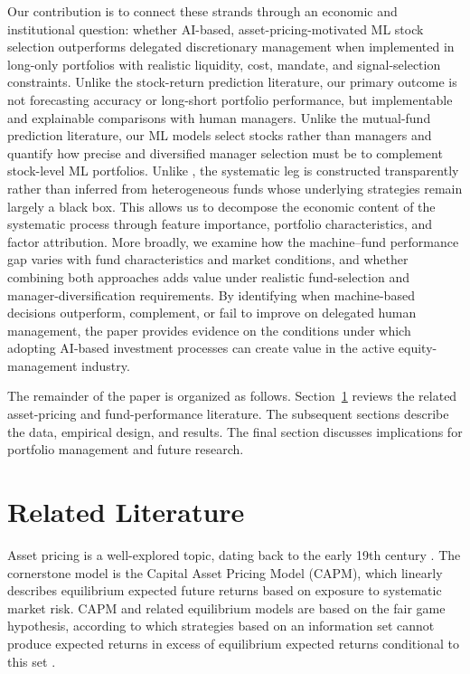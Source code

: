 \documentclass[preprint,12pt,authoryear]{elsarticle}
\begin{document}
Our contribution is to connect these strands through an economic and institutional question: whether AI-based, asset-pricing-motivated ML stock selection outperforms delegated discretionary management when implemented in long-only portfolios with realistic liquidity, cost, mandate, and signal-selection constraints. Unlike the stock-return prediction literature, our primary outcome is not forecasting accuracy or long-short portfolio performance, but implementable and explainable comparisons with human managers. Unlike the mutual-fund prediction literature, our ML models select stocks rather than managers and quantify how precise and diversified manager selection must be to complement stock-level ML portfolios. Unlike \citet{harveyrattraysinclairvanhemert2017}, the systematic leg is constructed transparently rather than inferred from heterogeneous funds whose underlying strategies remain largely a black box. This allows us to decompose the economic content of the systematic process through feature importance, portfolio characteristics, and factor attribution. More broadly, we examine how the machine–fund performance gap varies with fund characteristics and market conditions, and whether combining both approaches adds value under realistic fund-selection and manager-diversification requirements. By identifying when machine-based decisions outperform, complement, or fail to improve on delegated human management, the paper provides evidence on the conditions under which adopting AI-based investment processes can create value in the active equity-management industry.


The remainder of the paper is organized as follows. Section~\ref{sec:literature} reviews the related asset-pricing and fund-performance literature. The subsequent sections describe the data, empirical design, and results. The final section discusses implications for portfolio management and future research. 

\section{Related Literature}
\label{sec:literature}

Asset pricing is a well-explored topic, dating back to the early 19th century \citep{poitrasjovanovic2001}. The cornerstone model is the Capital Asset Pricing Model (CAPM), which linearly describes equilibrium expected future returns based on exposure to systematic market risk. CAPM and related equilibrium models are based on the fair game hypothesis, according to which strategies based on an information set cannot produce expected returns in excess of equilibrium expected returns conditional to this set \citep{fama1970}.   
   
\end{document}
